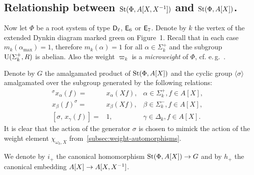 \subsection{Relationship between $\operatorname{St}(\Phi, A[X, X^{-1}])$ and $\operatorname{St}(\Phi, A[X])$.} \label{subsec:short-presentation}
Now let $\Phi$ be a root system of type $\mathsf{D}_\ell$, $\mathsf{E}_6$ or $\mathsf{E}_7$.
Denote by $k$ the vertex of the extended Dynkin diagram marked green on Figure~1.
Recall that in each case $m_k(\alpha_\mathrm{\max}) = 1$, therefore $m_k(\alpha) = 1$ for all $\alpha \in \Sigma_k^+$ and the subgroup $\operatorname{U}(\Sigma^+_k, R)$ is abelian.
Also the weight $\varpi_k$ is a \textit{microweight} of $\Phi$, cf. e.\,g.~\cite[\S~2]{Ge17}.

Denote by $G$ the amalgamated product of $\operatorname{St}(\Phi, A[X])$ and the cyclic group $\langle \sigma \rangle$ amalgamated over the subgroup generated by the following relations:
\begin{align}
    {}^\sigma x_{\alpha}(f) = & x_{\alpha} (Xf), & \alpha \in \Sigma^+_k, f \in A[X], \label{eq:sigma-sigma-plus} \\
    x_{\beta}(f)^ \sigma     =& x_{\beta} (Xf), & \beta \in \Sigma^-_k, f \in A[X], \label{eq:sigma-sigma-minus} \\
    [\sigma,\, x_\gamma(f)]   =& 1, & \gamma \in \Delta_k, f \in A[X]. \label{eq:sigma-delta}
\end{align}
It is clear that the action of the generator $\sigma$ is chosen to mimick the action of the weight element $\chi_{\omega_k, X}$ from~\cref{subsec:weight-automorphisms}.

We denote by $i_+$ the canonical homomorphism $\operatorname{St}(\Phi, A[X]) \to G$ and by $h_+$ the canonical embedding $A[X] \to A[X, X^{-1}]$.

